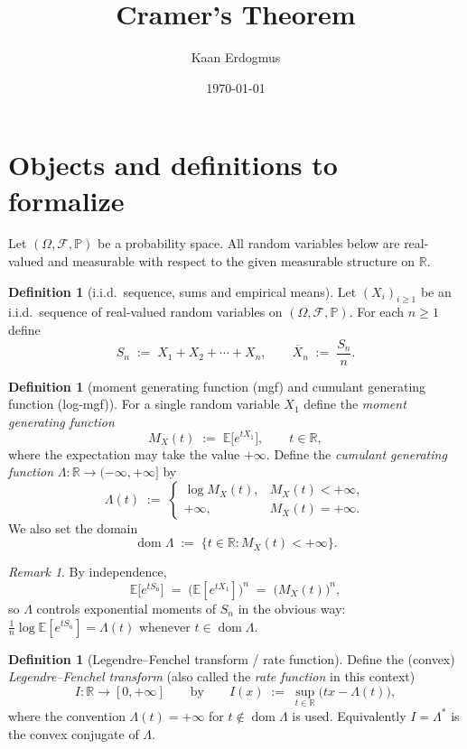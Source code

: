 \documentclass[12pt]{article}
\theoremstyle{definition}
\newtheorem{definition}[theorem]{Definition}
\theoremstyle{remark}
\newtheorem*{remark}{Remark}
\begin{document}
\title{Cramer's Theorem}
\author{Kaan Erdogmus}
\date{\today}
\maketitle

\section{Objects and definitions to formalize}

Let $(\Omega,\mathcal{F},\mathbb{P})$ be a probability space.  All random variables below are real-valued and measurable with respect to the given measurable structure on $\mathbb{R}$.

\begin{definition}[i.i.d.\ sequence, sums and empirical means]
Let $(X_i)_{i\ge 1}$ be an i.i.d.\ sequence of real-valued random variables on $(\Omega,\mathcal{F},\mathbb{P})$. For each $n\ge 1$ define
\[
S_n \;:=\; X_1 + X_2 + \cdots + X_n,\qquad
\overline{X}_n \;:=\; \frac{S_n}{n}.
\]
\end{definition}

\begin{definition}[moment generating function (mgf) and cumulant generating function (log-mgf)]
For a single random variable $X_1$ define the \emph{moment generating function}
\[
M_{X}(t) \;:=\; \mathbb{E}\big[e^{t X_1}\big], \qquad t\in\mathbb{R},
\]
where the expectation may take the value $+\infty$.  Define the \emph{cumulant generating function} $\Lambda:\mathbb{R}\to(-\infty,+\infty]$ by
\[
\Lambda(t) \;:=\; \begin{cases}
\log M_X(t), & M_X(t)<+\infty,\\[4pt]
+\infty, & M_X(t)=+\infty.
\end{cases}
\]
We also set the domain
\[
\operatorname{dom}\Lambda \;:=\; \{t\in\mathbb{R} : M_X(t)<+\infty\}.
\]
\end{definition}

\begin{remark}
By independence,
\[
\mathbb{E}\big[e^{t S_n}\big] \;=\; \big(\mathbb{E}[e^{t X_1}]\big)^n
       \;=\; \big(M_X(t)\big)^n,
\]
so $\Lambda$ controls exponential moments of $S_n$ in the obvious way: $\frac{1}{n}\log\mathbb{E}[e^{t S_n}] = \Lambda(t)$ whenever $t\in\operatorname{dom}\Lambda$.
\end{remark}

\begin{definition}[Legendre--Fenchel transform / rate function]
Define the (convex) \emph{Legendre--Fenchel transform} (also called the \emph{rate function} in this context)
\[
I:\mathbb{R}\to[0,+\infty]\qquad\text{by}\qquad
I(x) \;:=\; \sup_{t\in\mathbb{R}} \big( t x - \Lambda(t) \big),
\]
where the convention $\Lambda(t)=+\infty$ for $t\notin\operatorname{dom}\Lambda$ is used.  Equivalently $I=\Lambda^*$ is the convex conjugate of $\Lambda$.
\end{definition}
\end{document}
